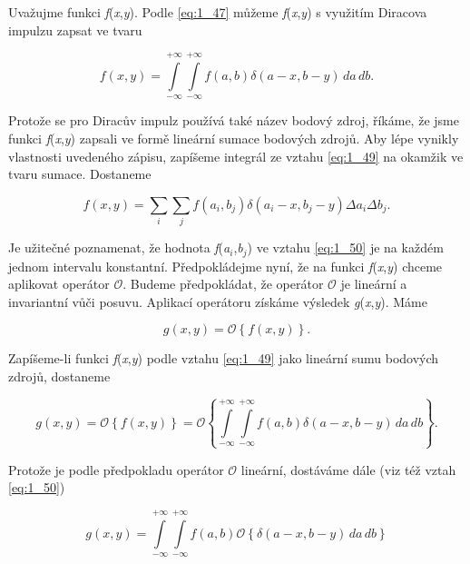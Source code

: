 Uvažujme funkci \textit{f}(\textit{x},\textit{y}). Podle \eqref{eq:1_47} můžeme \textit{f}(\textit{x},\textit{y}) s využitím Diracova impulzu zapsat ve tvaru

\begin{equation} \label{eq:1_49}
    f(x, y) = \int\limits_{-\infty}^{+\infty} \int\limits_{-\infty}^{+\infty} f(a, b) \delta(a-x, b-y) \,da \,db.
\end{equation}

Protože se pro Diracův impulz používá také název bodový zdroj, říkáme, že jsme funkci \textit{f}(\textit{x},\textit{y}) zapsali ve formě lineární sumace bodových zdrojů. Aby lépe vynikly vlastnosti uvedeného zápisu, zapíšeme integrál ze vztahu \eqref{eq:1_49} na okamžik ve tvaru sumace. Dostaneme

\begin{equation} \label{eq:1_50}
    f(x, y) = \sum\limits_{i} \sum\limits_{j} f(a_i, b_j) \delta(a_i-x, b_j-y) \Delta a_i \Delta b_j.
\end{equation}

Je užitečné poznamenat, že hodnota \textit{f}(\textit{a}$_i$,\textit{b}$_j$) ve vztahu \eqref{eq:1_50} je na každém jednom intervalu konstantní. Předpokládejme nyní, že na funkci \textit{f}(\textit{x},\textit{y}) chceme aplikovat operátor $\mathscr{O}$. Budeme předpokládat, že operátor $\mathscr{O}$ je lineární a invariantní vůči posuvu. Aplikací operátoru získáme výsledek  \textit{g}(\textit{x},\textit{y}). Máme 

\begin{equation} \label{eq:1_51}
    g(x, y) = \mathscr{O} \left\{ f(x, y) \right\}.
\end{equation}

Zapíšeme-li funkci \textit{f}(\textit{x},\textit{y}) podle vztahu \eqref{eq:1_49} jako lineární sumu bodových zdrojů, dostaneme

\begin{equation} \label{eq:1_52}
    g(x, y) = \mathscr{O} \left\{ f(x, y) \right\} = \mathscr{O} \left\{ \int\limits_{-\infty}^{+\infty} \int\limits_{-\infty}^{+\infty} f(a, b) \delta(a-x, b-y) \,da \,db \right\}.
\end{equation}

Protože je podle předpokladu operátor $\mathscr{O}$ lineární, dostáváme dále (viz též vztah \eqref{eq:1_50})

\begin{equation} \label{eq:1_53}
    g(x, y) = \int\limits_{-\infty}^{+\infty} \int\limits_{-\infty}^{+\infty} f(a, b) \mathscr{O} \left\{ \delta(a-x, b-y) \,da \,db \right\}
\end{equation}

